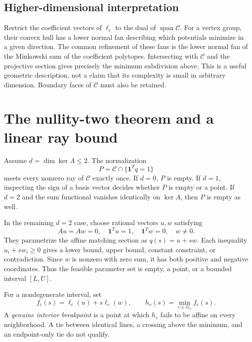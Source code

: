 \documentclass[11pt]{article}
\theoremstyle{definition}
\theoremstyle{remark}
\newcommand{\cone}{\mathcal C}\newcommand{\stdcone}{\mathcal K}
\newcommand{\Ker}{\operatorname{ker}}
\newcommand{\lin}{\operatorname{span}}
\begin{document}
\subsection{Higher-dimensional interpretation}

Restrict the coefficient vectors of $\ell_c$ to the dual of $\lin\cone$.
For a vertex group, their convex hull has a lower normal fan describing which
potentials minimize in a given direction. The common refinement of these
fans is the lower normal fan of the Minkowski sum of the coefficient
polytopes. Intersecting with $\cone$ and the projective section gives precisely
the minimum subdivision above. This is a useful geometric description, not
a claim that its complexity is small in arbitrary dimension. Boundary faces
of $\cone$ must also be retained.

\section{The nullity-two theorem and a linear ray bound}
\label{sec:twodimensional}

Assume $d=\dim\Ker A\le2$. The normalization
\begin{equation}
 P=\cone\cap\{\boldsymbol 1^Tq=1\}
 \label{eq:projective}
\end{equation}
meets every nonzero ray of $\cone$ exactly once. If $d=0$, $P$ is empty.
If $d=1$, inspecting the sign of a basis vector decides whether $P$ is empty
or a point. If $d=2$ and the sum functional vanishes identically on $\Ker A$,
then $P$ is empty as well.

In the remaining $d=2$ case, choose rational vectors $u,w$ satisfying
\begin{equation}
 Au=Aw=0,\quad \boldsymbol1^Tu=1,\quad
 \boldsymbol1^Tw=0,\quad w\ne0.
 \label{eq:sectionbasis}
\end{equation}
They parametrize the affine matching section as $q(s)=u+sw$.
Each inequality $u_i+sw_i\ge0$ gives a lower bound, upper bound, constant
constraint, or contradiction. Since $w$ is nonzero with zero sum, it has
both positive and negative coordinates. Thus the feasible parameter set is
empty, a point, or a bounded interval $[L,U]$.

For a nondegenerate interval, set
\begin{equation}
 f_c(s)=\ell_c(u)+s\ell_c(w),\qquad
 h_v(s)=\min_{c\in G_v} f_c(s).
 \label{eq:lines}
\end{equation}
A \emph{genuine interior breakpoint} is a point at which $h_v$ fails to be
affine on every neighborhood. A tie between identical lines, a crossing above
the minimum, and an endpoint-only tie do not qualify.
\end{document}
